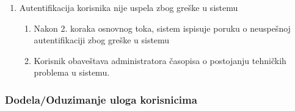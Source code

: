 \documentclass[a4paper]{article}
\begin{document}
\begin{itemize}
\begin{enumerate}
\begin{enumerate}
                \end{enumerate}
            \item Autentifikacija korisnika nije uspela zbog greške u sistemu
                \begin{enumerate}
                    \item Nakon 2. koraka osnovnog toka, sistem ispisuje poruku o neuspešnoj autentifikaciji zbog greške u sistemu
                    \item Korisnik obaveštava administratora časopisa o postojanju tehničkih problema u sistemu.
                \end{enumerate}
        \end{enumerate}
\end{itemize}



\subsubsection{Dodela/Oduzimanje uloga korisnicima}
\end{document}
